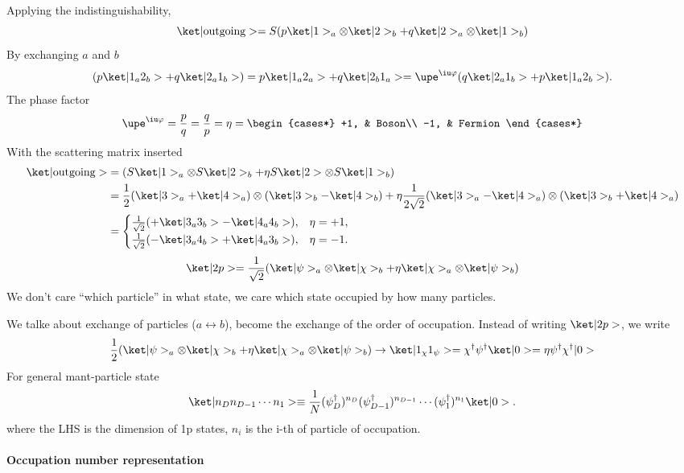 Applying the indistinguishability,
\[
  \ket|\text{outgoing}>
= S(p\ket|1>_a \otimes \ket|2>_b + q\ket|2>_a \otimes \ket|1>_b)
\]
By exchanging $a$ and $b$
\[
  (p\ket|1_a2_b> + q\ket|2_a1_b>)
=  p\ket|1_a2_a> + q\ket|2_b1_a>
= \upe^{\iu\varphi} (q\ket|2_a1_b> + p\ket|1_a2_b>).
\]
The phase factor
\[
  \upe^{\iu\varphi} = \frac pq = \frac qp = \eta =
  \begin{cases*}
    +1, & Boson\\
    -1, & Fermion
  \end{cases*}
\]
With the scattering matrix inserted
\begin{align*}
  \ket|\text{outgoing}> & = (S\ket|1>_a \otimes S\ket|2>_b
     + \eta S\ket|2> \otimes S\ket|1>_b)\\
& = \frac12 (\ket|3>_a + \ket|4>_a) \otimes (\ket|3>_b - \ket|4>_b)
+ \eta \frac1{2\sqrt2} (\ket|3>_a - \ket|4>_a) \otimes
  (\ket|3>_b + \ket|4>_a)\\
& = \begin{cases}
  \frac1{\sqrt2} (+\ket|3_a3_b> - \ket|4_a4_b>), & \eta = +1,\\
  \frac1{\sqrt2} (-\ket|3_a4_b> + \ket|4_a3_b>), & \eta = -1.
\end{cases}
\end{align*}
\[
  \ket|2p> = \frac1{\sqrt2}
  (\ket|\psi>_a \otimes \ket|\chi>_b + \eta \ket|\chi>_a \otimes \ket|\psi>_b)
\]
We don't care ``which particle'' in what state, we care which state occupied by
how many particles.

We talke about exchange of particles ($a \leftrightarrow b$),
become the exchange of the order of occupation.
Instead of writing $\ket|2p>$, we write
\[
  \frac12(\ket|\psi>_a \otimes \ket|\chi>_b
    + \eta\ket|\chi>_a \otimes \ket|\psi>_b)
  \to \ket|1_\chi1_\psi> = \chi^\dagger \psi^\dagger \ket|0>
  = \eta \psi^\dagger \chi^\dagger |0>
\]
For general mant-particle state
\[
  \ket|n_D n_{D-1} \cdots n_1> \equiv \frac1N
  (\psi_D^\dagger)^{n_D} (\psi_{D-1}^\dagger)^{n_{D-1}} \cdots
  (\psi_1^\dagger)^{n_1} \ket|0>.
\]
where the LHS is the dimension of 1p states, $n_i$ is the i-th of particle of
occupation.
\paragraph{Occupation number representation}

